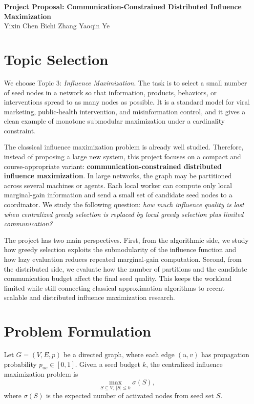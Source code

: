 \documentclass[10pt]{article}
\begin{document}
\begin{center}
{\large\bfseries Project Proposal: Communication-Constrained Distributed Influence Maximization}\vspace{1mm}\\
Yixin Chen \quad Bichi Zhang \quad Yaoqin Ye
\end{center}
\vspace{-3mm}

\section{Topic Selection}
We choose Topic 3: \emph{Influence Maximization}. The task is to select a small number of seed nodes in a network so that information, products, behaviors, or interventions spread to as many nodes as possible. It is a standard model for viral marketing, public-health intervention, and misinformation control, and it gives a clean example of monotone submodular maximization under a cardinality constraint.

The classical influence maximization problem is already well studied. Therefore, instead of proposing a large new system, this project focuses on a compact and course-appropriate variant: \textbf{communication-constrained distributed influence maximization}. In large networks, the graph may be partitioned across several machines or agents. Each local worker can compute only local marginal-gain information and send a small set of candidate seed nodes to a coordinator. We study the following question: \emph{how much influence quality is lost when centralized greedy selection is replaced by local greedy selection plus limited communication?}

The project has two main perspectives. First, from the algorithmic side, we study how greedy selection exploits the submodularity of the influence function and how lazy evaluation reduces repeated marginal-gain computation. Second, from the distributed side, we evaluate how the number of partitions and the candidate communication budget affect the final seed quality. This keeps the workload limited while still connecting classical approximation algorithms to recent scalable and distributed influence maximization research.

\section{Problem Formulation}
Let $G=(V,E,p)$ be a directed graph, where each edge $(u,v)$ has propagation probability $p_{uv}\in[0,1]$. Given a seed budget $k$, the centralized influence maximization problem is
\[
\max_{S\subseteq V,\ |S|\le k}\sigma(S),
\]
where $\sigma(S)$ is the expected number of activated nodes from seed set $S$.
\end{document}
